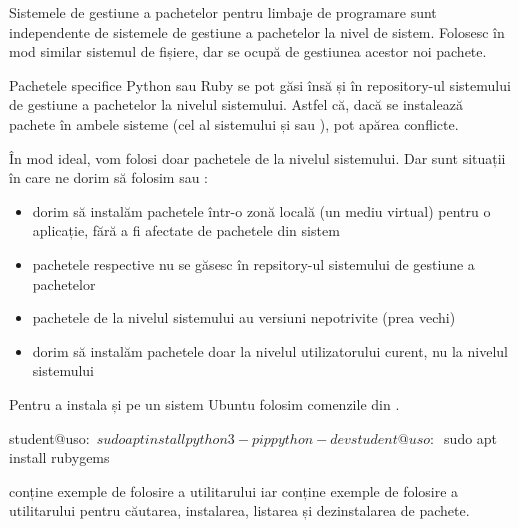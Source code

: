 Sistemele de gestiune a pachetelor pentru limbaje de programare sunt independente de sistemele de gestiune a pachetelor la nivel de sistem. Folosesc în mod similar sistemul de fișiere, dar se ocupă de gestiunea acestor noi pachete.

Pachetele specifice Python sau Ruby se pot găsi însă și în repository-ul sistemului de gestiune a pachetelor la nivelul sistemului. Astfel că, dacă se instalează pachete în ambele sisteme (cel al sistemului și  sau ), pot apărea conflicte.

În mod ideal, vom folosi doar pachetele de la nivelul sistemului. Dar sunt situații în care ne dorim să folosim  sau :
\begin{itemize}
  \item dorim să instalăm pachetele într-o zonă locală (un mediu virtual) pentru o aplicație, fără a fi afectate de pachetele din sistem
  \item pachetele respective nu se găsesc în repsitory-ul sistemului de gestiune a pachetelor
  \item pachetele de la nivelul sistemului au versiuni nepotrivite (prea vechi)
  \item dorim să instalăm pachetele doar la nivelul utilizatorului curent, nu la nivelul sistemului
\end{itemize}

Pentru a instala  și  pe un sistem Ubuntu folosim comenzile din .

\begin{screen}[caption={Instalarea Python pip și Ruby gem pe Ubuntu},label={lst:package:install-pip-gem}]
student@uso:~$ sudo apt install python3-pip python-dev

student@uso:~$ sudo apt install rubygems
\end{screen}

 conține exemple de folosire a utilitarului  iar  conține exemple de folosire a utilitarului  pentru căutarea, instalarea, listarea și dezinstalarea de pachete.

